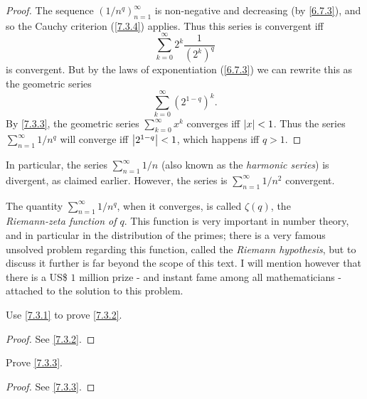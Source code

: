 \begin{proof}
  The sequence \((1 / n^q)_{n = 1}^\infty\) is non-negative and decreasing (by \cref{6.7.3}), and so the Cauchy criterion (\cref{7.3.4}) applies.
  Thus this series is convergent iff
  \[
    \sum_{k = 0}^\infty 2^k \dfrac{1}{(2^k)^q}
  \]
  is convergent.
  But by the laws of exponentiation (\cref{6.7.3}) we can rewrite this as the geometric series
  \[
    \sum_{k = 0}^\infty (2^{1 - q})^k.
  \]
  By \cref{7.3.3}, the geometric series \(\sum_{k = 0}^\infty x^k\) converges iff \(\left\lvert x\right\rvert < 1\).
  Thus the series \(\sum_{n = 1}^\infty 1 / n^q\) will converge iff \(\left\lvert2^{1 - q}\right\rvert < 1\), which happens iff \(q > 1\).
\end{proof}

\begin{note}
  In particular, the series \(\sum_{n = 1}^\infty 1 / n\) (also known as the \emph{harmonic series}) is divergent, as claimed earlier.
  However, the series is \(\sum_{n = 1}^\infty 1 / n^2\) convergent.
\end{note}

\begin{rmk}\label{7.3.8}
  The quantity \(\sum_{n = 1}^\infty 1 / n^q\), when it converges, is called \(\zeta(q)\), the \\
  \emph{Riemann-zeta function of \(q\)}.
  This function is very important in number theory, and in particular in the distribution of the primes;
  there is a very famous unsolved problem regarding this function, called the \emph{Riemann hypothesis}, but to discuss it further is far beyond the scope of this text.
  I will mention however that there is a US\$ \(1\) million prize
  - and instant fame among all mathematicians -
  attached to the solution to this problem.
\end{rmk}

\exercisesection

\begin{ex}\label{ex:7.3.1}
  Use \cref{7.3.1} to prove \cref{7.3.2}.
\end{ex}

\begin{proof}
  See \cref{7.3.2}.
\end{proof}

\begin{ex}\label{ex:7.3.2}
  Prove \cref{7.3.3}.
\end{ex}

\begin{proof}
  See \cref{7.3.3}.
\end{proof}

